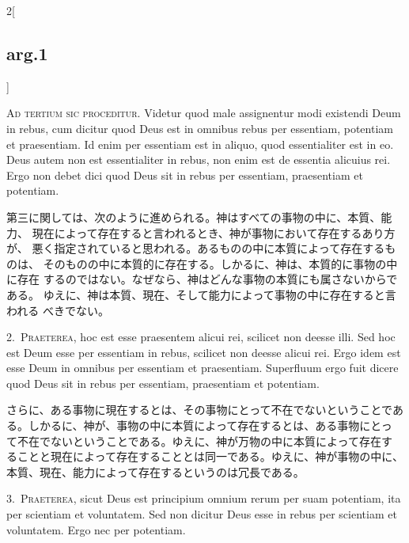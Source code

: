 \documentclass[paper=a4paper,fontsize=10pt,jafontsize=9pt,titlepage]{jlreq}
\begin{document}
\begin{paracol}{2}[\subsection{arg.1}]

{\huge A}{\scshape d tertium sic proceditur}. Videtur quod male assignentur modi
 existendi Deum in rebus, cum dicitur quod Deus est in omnibus rebus per
 essentiam, potentiam et praesentiam. Id enim per essentiam est in
 aliquo, quod essentialiter est in eo. Deus autem non est essentialiter
 in rebus, non enim est de essentia alicuius rei. Ergo non debet dici
 quod Deus sit in rebus per essentiam, praesentiam et potentiam.

\switchcolumn

第三に関しては、次のように進められる。神はすべての事物の中に、本質、能力、
 現在によって存在すると言われるとき、神が事物において存在するあり方が、
 悪く指定されていると思われる。あるものの中に本質によって存在するものは、
 そのものの中に本質的に存在する。しかるに、神は、本質的に事物の中に存在
 するのではない。なぜなら、神はどんな事物の本質にも属さないからである。
 ゆえに、神は本質、現在、そして能力によって事物の中に存在すると言われる
 べきでない。


2.~{\scshape Praeterea}, hoc est esse praesentem alicui rei, scilicet non
 deesse illi. Sed hoc est Deum esse per essentiam in rebus, scilicet non
 deesse alicui rei. Ergo idem est esse Deum in omnibus per essentiam et
 praesentiam. Superfluum ergo fuit dicere quod Deus sit in rebus per
 essentiam, praesentiam et potentiam.

\switchcolumn

さらに、ある事物に現在するとは、その事物にとって不在でないということであ
 る。しかるに、神が、事物の中に本質によって存在するとは、ある事物にとっ
 て不在でないということである。ゆえに、神が万物の中に本質によって存在す
 ることと現在によって存在することとは同一である。ゆえに、神が事物の中に、
 本質、現在、能力によって存在するというのは冗長である。


3.~{\scshape Praeterea}, sicut Deus est principium omnium rerum per suam
 potentiam, ita per scientiam et voluntatem. Sed non dicitur Deus esse
 in rebus per scientiam et voluntatem. Ergo nec per potentiam.


\end{paracol}
\end{document}

